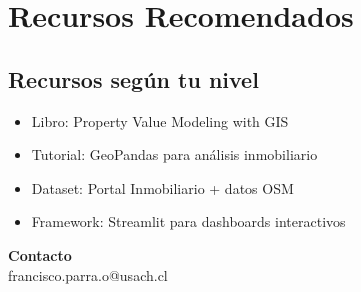 \documentclass[11pt,a4paper]{article}
\begin{document}
\section*{ Recursos Recomendados}

\subsection*{Recursos según tu nivel}

\begin{itemize}[leftmargin=*]
    \item Libro: Property Value Modeling with GIS
    \item Tutorial: GeoPandas para análisis inmobiliario
    \item Dataset: Portal Inmobiliario + datos OSM
    \item Framework: Streamlit para dashboards interactivos
\end{itemize}


\vspace{0.5cm}

\begin{tcolorbox}[colback=gray!10,colframe=gray!50]
\centering
\textbf{Contacto}\\[0.2cm]
 francisco.parra.o@usach.cl
\end{tcolorbox}
\end{document}
